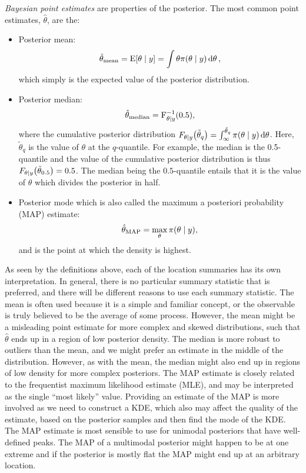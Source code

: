 \textit{Bayesian point estimates} are properties of the posterior. The most common point estimates, $\hat{\theta}$, are the:

\begin{itemize}
    \item Posterior mean: 
    \begin{equation}\label{eq:posterior_mean}
        \hat{\theta}_\mathrm{mean} = \mathrm{E} \qty[\theta \mid y] = \int \theta \pi \qty(\theta \mid y) \dd{\theta}, 
    \end{equation}
    which simply is the expected value of the posterior distribution. 
    \item Posterior median: 
    \begin{equation}\label{eq:posterior_median}
        \hat{\theta}_\mathrm{median} = \mathrm{F}_{\theta \mid y}^{-1} \qty(0.5),
    \end{equation}
    where the cumulative posterior distribution $F_{\theta \mid y} \qty(\tilde{\theta}_q) = \int_{\infty}^{\tilde{\theta}_q} \pi \qty(\theta \mid y) \dd{\theta}$. Here, $\tilde{\theta}_q$ is the value of $\theta$ at the $q$-quantile. For example, the median is the 0.5-quantile and the value of the cumulative posterior distribution is thus $F_{\theta \mid y} \qty(\tilde{\theta}_{0.5}) = 0.5$. The median being the $0.5$-quantile entails that it is the value of $\theta$ which divides the posterior in half.
    \item Posterior mode which is also called the maximum a posteriori probability (MAP) estimate: 
    \begin{equation}\label{eq:posterior_map}
        \hat{\theta}_\mathrm{MAP} = \max_\theta \pi \qty(\theta \mid y),
    \end{equation}
    and is the point at which the density is highest. 
\end{itemize}

As seen by the definitions above, each of the location summaries has its own interpretation. In general, there is no particular summary statistic that is preferred, and there will be different reasons to use each summary statistic. The mean is often used because it is a simple and familiar concept, or the observable is truly believed to be the average of some process. However, the mean might be a misleading point estimate for more complex and skewed distributions, such that $\hat{\theta}$ ends up in a region of low posterior density. The median is more robust to outliers than the mean, and we might prefer an estimate in the middle of the distribution. However, as with the mean, the median might also end up in regions of low density for more complex posteriors. The MAP estimate is closely related to the frequentist maximum likelihood estimate (MLE), and may be interpreted as the single “most likely” value. Providing an estimate of the MAP is more involved as we need to construct a KDE, which also may affect the quality of the estimate, based on the posterior samples and then find the mode of the KDE. The MAP estimate is most sensible to use for unimodal posteriors that have well-defined peaks. The MAP of a multimodal posterior might happen to be at one extreme and if the posterior is mostly flat the MAP might end up at an arbitrary location.  


